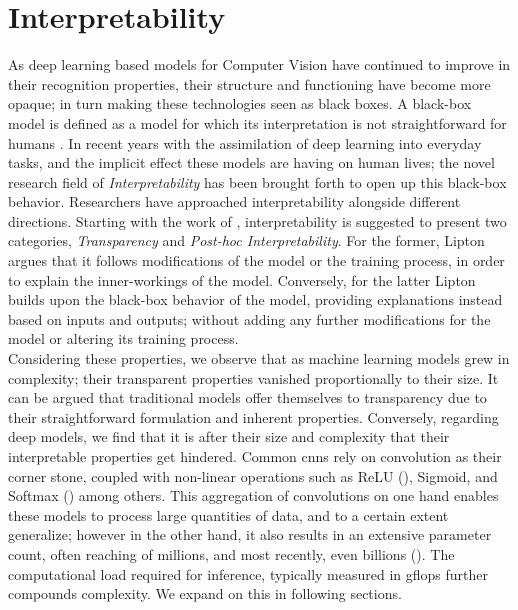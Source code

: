 \section{Interpretability}
\label{rel:sec_int}
As deep learning based models for Computer Vision have continued to improve in their recognition 
properties, their structure and functioning have become more opaque; in turn making these 
technologies seen as black boxes. A black-box model is defined as a model for which its 
interpretation is not straightforward for humans \autocite{petch2022opening}. In recent years 
with the assimilation of deep learning into everyday tasks, and the implicit effect these models 
are having on human lives; the novel research field of \emph{Interpretability} has been brought 
forth to open up this black-box behavior. Researchers have approached interpretability alongside 
different directions. Starting with the work of \cite{li2018deep}, interpretability is suggested 
to present two categories, \emph{Transparency} and \emph{Post-hoc Interpretability}.
For the former, Lipton argues that it follows modifications of the model or the training process, 
in order to explain the inner-workings of the model. Conversely, for the latter Lipton builds upon 
the black-box behavior of the model, providing explanations instead based on inputs and outputs; 
without adding any further modifications for the model or altering its training process.\\

\noindent Considering these properties, we observe that as machine learning models grew in 
complexity; their transparent properties vanished proportionally to their size. It can be argued 
that traditional models offer themselves to  transparency due to their straightforward formulation 
and inherent properties. Conversely, regarding deep models, we find that it is after their size and 
complexity that their interpretable properties get hindered. Common  \glspl{cnn} 
rely on convolution as their corner stone, coupled with non-linear operations such as 
ReLU (\cite{fukushima1975cognitron}), Sigmoid, and Softmax (\cite{hopfield1985neural}) among others.
This aggregation of convolutions on one hand enables these models to process large quantities of 
data, and to a certain extent generalize; however in the other hand, it also results in an extensive 
parameter count, often reaching of millions, and most recently, even billions (\cite{openai_compute}). 
The computational load required for inference, typically measured in \gls{gflops} further compounds 
complexity. We expand on this in following sections.\\

